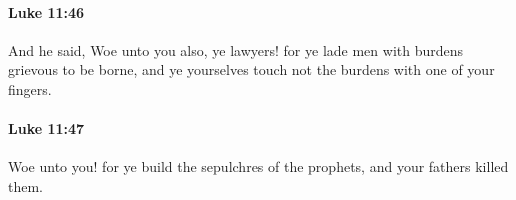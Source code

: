 		\paragraph{Luke 11:46} %
			\label{LUKE-11-46}

			And he said, Woe unto you also, ye lawyers! for ye lade men with burdens grievous to be borne, and ye yourselves touch not the burdens with one of your fingers.

			\begin{framed}
			\scriptsize
				\begin{compactdesc}
					\item[SBLG] 
				\end{compactdesc}
			\end{framed}

		\paragraph{Luke 11:47} %
			\label{LUKE-11-47}

			Woe unto you! for ye build the sepulchres of the prophets, and your fathers killed them.

